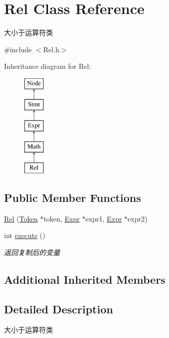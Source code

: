 \hypertarget{class_rel}{}\section{Rel Class Reference}
\label{class_rel}


大小于运算符类  




{\ttfamily \#include $<$Rel.\+h$>$}

Inheritance diagram for Rel\+:\begin{figure}[H]
\begin{center}
\leavevmode
\includegraphics[height=5.000000cm]{class_rel}
\end{center}
\end{figure}
\subsection*{Public Member Functions}
\begin{DoxyCompactItemize}
\item 
\hyperlink{class_rel_a1f60bc90adde19ed35f26ea8b2cfd91c}{Rel} (\hyperlink{class_token}{Token} $\ast$token, \hyperlink{class_expr}{Expr} $\ast$expr1, \hyperlink{class_expr}{Expr} $\ast$expr2)
\item 
\mbox{\label{class_rel_a82b2f3b75a2b9e81631f2659d42a36d1}} 
int \hyperlink{class_rel_a82b2f3b75a2b9e81631f2659d42a36d1}{execute} ()
\begin{DoxyCompactList}\small\item\em 返回复制后的变量 \end{DoxyCompactList}\end{DoxyCompactItemize}
\subsection*{Additional Inherited Members}


\subsection{Detailed Description}
大小于运算符类 

